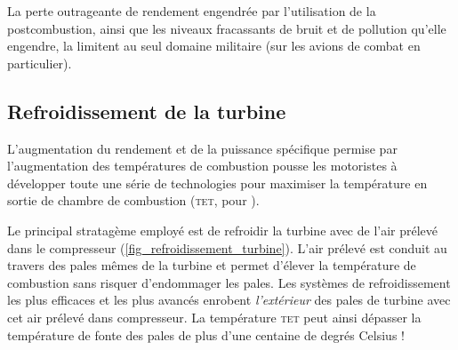 		La perte outrageante de rendement engendrée par l’utilisation de la postcombustion, ainsi que les niveaux fracassants de bruit et de pollution qu’elle engendre, la limitent au seul domaine militaire (sur les avions de combat en particulier).

		

	\subsection{Refroidissement de la turbine}
	\label{ch_refroidissement_turbine}

		L’augmentation du rendement et de la puissance spécifique permise par l’augmentation des températures de combustion pousse les motoristes à développer toute une série de technologies pour maximiser la température en sortie de chambre de combustion (\textsc{tet}, pour ).

		Le principal stratagème employé est de refroidir la turbine avec de l’air prélevé dans le compresseur (\cref{fig_refroidissement_turbine}). L’air prélevé est conduit au travers des pales mêmes de la turbine et permet d’élever la température de combustion sans risquer d’endommager les pales. Les systèmes de refroidissement les plus efficaces et les plus avancés enrobent \emph{l’extérieur} des pales de turbine avec cet air prélevé dans compresseur. La température \textsc{tet} peut ainsi dépasser la température de fonte des pales de plus d’une centaine de degrés Celsius !

